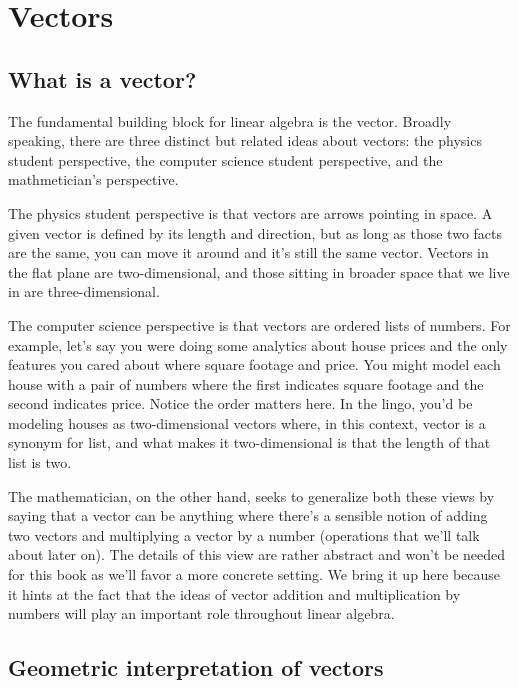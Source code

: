 \section{Vectors}

\subsection{What is a vector?}

The fundamental building block for linear algebra is the vector. Broadly
speaking, there are three distinct but related ideas about vectors: the physics
student perspective, the computer science student perspective, and the
mathmetician's perspective.

The physics student perspective is that vectors are arrows pointing in space. A
given vector is defined by its length and direction, but as long as those two
facts are the same, you can move it around and it's still the same vector.
Vectors in the flat plane are two-dimensional, and those sitting in broader
space that we live in are three-dimensional.

The computer science perspective is that vectors are ordered lists of numbers.
For example, let's say you were doing some analytics about house prices and the
only features you cared about where square footage and price. You might model
each house with a pair of numbers where the first indicates square footage and
the second indicates price. Notice the order matters here. In the lingo, you'd
be modeling houses as two-dimensional vectors where, in this context, vector is
a synonym for list, and what makes it two-dimensional is that the length of that
list is two.

The mathematician, on the other hand, seeks to generalize both these views by
saying that a vector can be anything where there's a sensible notion of adding
two vectors and multiplying a vector by a number (operations that we'll talk
about later on). The details of this view are rather abstract and won't be
needed for this book as we'll favor a more concrete setting. We bring it up here
because it hints at the fact that the ideas of vector addition and
multiplication by numbers will play an important role throughout linear algebra.

\subsection{Geometric interpretation of vectors}

